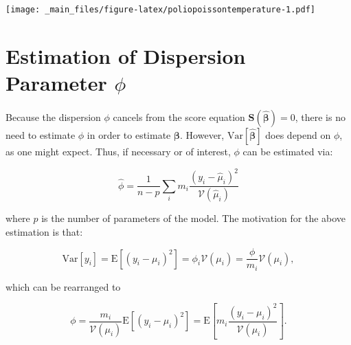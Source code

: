 \documentclass[
  12pt,
]{book}
\newenvironment{Shaded}{\begin{snugshade}}{\end{snugshade}}
\newcommand{\AttributeTok}[1]{\textcolor[rgb]{0.13,0.29,0.53}{#1}}
\newcommand{\DecValTok}[1]{\textcolor[rgb]{0.00,0.00,0.81}{#1}}
\newcommand{\FunctionTok}[1]{\textcolor[rgb]{0.13,0.29,0.53}{\textbf{#1}}}
\newcommand{\NormalTok}[1]{#1}
\newcommand{\SpecialCharTok}[1]{\textcolor[rgb]{0.81,0.36,0.00}{\textbf{#1}}}
\newcommand{\StringTok}[1]{\textcolor[rgb]{0.31,0.60,0.02}{#1}}
\begin{document}
\begin{Shaded}
\end{Shaded}

\texttt{[image: \_main\_files/figure-latex/poliopoissontemperature-1.pdf]}

\section{\texorpdfstring{Estimation of Dispersion Parameter \(\phi\)}{Estimation of Dispersion Parameter \textbackslash phi}}\label{estimation-of-dispersion-parameter-phi}

Because the dispersion \(\phi\) cancels from the score equation \(\boldsymbol{S}(\hat{\boldsymbol{\beta}}) = 0\), there is no need to estimate \(\phi\) in order to estimate \(\boldsymbol{\beta}\). However, \({\mathrm{Var}}[\hat{\boldsymbol{\beta}}]\) does depend on \(\phi\), as one might expect. Thus, if necessary or of interest, \(\phi\) can be estimated via:

\begin{equation}
  \hat{\phi}
  = \frac{1}{n-p} \sum_{i} m_{i} \frac{(y_{i} - \hat{\mu}_{i})^{2}}{\mathcal{V}(\hat{\mu}_{i})}
  \label{eq:estimatephi}
\end{equation}

where \(p\) is the number of parameters of the model. The motivation for the above estimation is that:

\begin{equation}
  {\mathrm{Var}}[y_{i}]
  = {\mathrm E}[(y_{i} - \mu_{i})^{2}]
  = \phi_{i}\mathcal{V}(\mu_{i})
  = \frac{\phi}{m_{i}} \mathcal{V}(\mu_{i}),
\end{equation}

which can be rearranged to

\begin{equation}
  \phi
  = \frac{m_{i}}{\mathcal{V}(\mu_{i})} {\mathrm E}[(y_{i} - \mu_{i})^{2}]
  = \mathrm{E} \left[ m_{i} \frac{(y_{i} - \mu_{i})^{2}}{\mathcal{V}(\mu_{i})} \right].
\end{equation}
\end{document}

